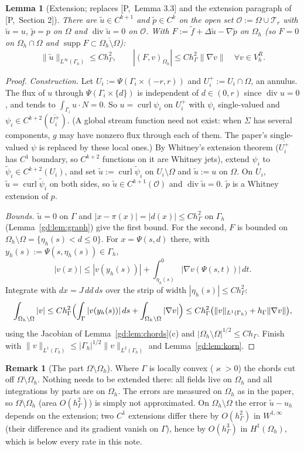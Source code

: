 \documentclass[11pt,reqno]{amsart}
\theoremstyle{plain}
\newtheorem{lemma}[theorem]{Lemma}
\theoremstyle{definition}
\newtheorem{remark}[theorem]{Remark}
\newcommand{\hG}{h_\Gamma}
\newcommand{\Gh}{\Gamma_h}
\newcommand{\Oh}{\Omega_h}
\newcommand{\VR}{V_h^R}
\newcommand{\ut}{\tilde u}
\newcommand{\pt}{\tilde p}
\newcommand{\ft}{\tilde f}
\newcommand{\psit}{\tilde\psi}
\newcommand{\norm}[1]{\lVert #1\rVert}
\newcommand{\curl}{\operatorname{curl}}
\renewcommand{\div}{\operatorname{div}}
\newcommand{\kap}{\varkappa}            %
\newcommand{\Pref}[1]{\textup{[P,~#1]}}
\begin{document}
\begin{lemma}[Extension; replaces \Pref{Lemma 3.3} and the extension paragraph of \Pref{Section 2}]\label{gd:lem:ext}
There are $\ut\in C^{k+1}$ and $\pt\in C^{k}$ on the open set $\mathcal O:=\Omega\cup\mathcal T_r$ with $\ut=u$, $\pt=p$ on $\Omega$ and $\div\ut=0$ on $\mathcal O$. With $F:=\ft+\Delta\ut-\nabla\pt$ on $\Oh$ (so $F=0$ on $\Oh\cap\Omega$ and $\operatorname{supp}F\subset\overline{\Oh\setminus\Omega}$):
\[
\norm{\ut}_{L^\infty(\Gh)}\le C\hG^2,\qquad|(F,v)_{\Oh}|\le C\hG^2\norm{\nabla v}\quad\forall v\in\VR .
\]
\end{lemma}

\begin{proof}
\emph{Construction.} Let $U_i:=\Psi(\Gamma_i\times(-r,r))$ and $U_i^+:=U_i\cap\Omega$, an annulus. The flux of $u$ through $\Psi(\Gamma_i\times\{d\})$ is independent of $d\in(0,r)$ since $\div u=0$, and tends to $\int_{\Gamma_i}u\cdot N=0$. So $u=\curl\psi_i$ on $U_i^+$ with $\psi_i$ single-valued and $\psi_i\in C^{k+2}(\overline{U_i^+})$. (A global stream function need not exist: when $\Sigma$ has several components, $g$ may have nonzero flux through each of them. The paper's single-valued $\psi$ is replaced by these local ones.) By Whitney's extension theorem ($\overline{U_i^+}$ has $C^1$ boundary, so $C^{k+2}$ functions on it are Whitney jets), extend $\psi_i$ to $\psit_i\in C^{k+2}(U_i)$, and set $\ut:=\curl\psit_i$ on $U_i\setminus\Omega$ and $\ut:=u$ on $\Omega$. On $U_i$, $\ut=\curl\psit_i$ on both sides, so $\ut\in C^{k+1}(\mathcal O)$ and $\div\ut=0$. $\pt$ is a Whitney extension of $p$.

\emph{Bounds.} $\ut=0$ on $\Gamma$ and $|x-\pi(x)|=|d(x)|\le C\hG^2$ on $\Gh$ (Lemma~\ref{gd:lem:graph}) give the first bound. For the second, $F$ is bounded on $\Oh\setminus\Omega=\{\eta_h(s)<d\le0\}$. For $x=\Psi(s,d)$ there, with $y_h(s):=\Psi(s,\eta_h(s))\in\Gh$,
\[
|v(x)|\le|v(y_h(s))|+\int_{\eta_h(s)}^0|\nabla v(\Psi(s,t))|\,dt .
\]
Integrate with $dx=J\,dd\,ds$ over the strip of width $|\eta_h(s)|\le C\hG^2$:
\[
\int_{\Oh\setminus\Omega}|v|\le C\hG^2\Bigl(\int_\Gamma|v(y_h(s))|\,ds+\int_{\Oh\setminus\Omega}|\nabla v|\Bigr)\le C\hG^2\bigl(\norm{v}_{L^1(\Gh)}+\hG\norm{\nabla v}\bigr),
\]
using the Jacobian of Lemma~\ref{gd:lem:chords}(c) and $|\Oh\setminus\Omega|^{1/2}\le C\hG$. Finish with $\norm{v}_{L^1(\Gh)}\le|\Gh|^{1/2}\norm{v}_{L^2(\Gh)}$ and Lemma~\ref{gd:lem:korn}.
\end{proof}

\begin{remark}[The part $\Omega\setminus\Oh$]\label{gd:rem:outside}
Where $\Gamma$ is locally convex ($\kap>0$) the chords cut off $\Omega\setminus\Oh$. Nothing needs to be extended there: all fields live on $\Oh$ and all integrations by parts are on $\Oh$. The errors are measured on $\Oh$ as in the paper, so $\Omega\setminus\Oh$ (area $O(\hG^2)$) is simply not approximated. On $\Oh\setminus\Omega$ the error $\ut-u_h$ depends on the extension; two $C^1$ extensions differ there by $O(\hG^2)$ in $W^{1,\infty}$ (their difference and its gradient vanish on $\Gamma$), hence by $O(\hG^3)$ in $H^1(\Oh)$, which is below every rate in this note.
\end{remark}
\end{document}
